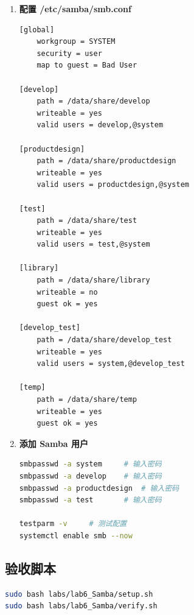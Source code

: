 \documentclass[12pt,a4paper]{ctexart}
\begin{document}
\begin{enumerate}[label=\arabic*.,leftmargin=*]
\begin{cmdbox}
\begin{lstlisting}[language=bash]
setfacl -m g:develop:rwx /data/share/develop_test
setfacl -m g:test:rwx    /data/share/develop_test
  \end{lstlisting}
  \end{cmdbox}

  \item \textbf{配置 /etc/samba/smb.conf}

  \begin{cmdbox}
  \small
  \begin{lstlisting}[language=bash]
[global]
    workgroup = SYSTEM
    security = user
    map to guest = Bad User

[develop]
    path = /data/share/develop
    writeable = yes
    valid users = develop,@system

[productdesign]
    path = /data/share/productdesign
    writeable = yes
    valid users = productdesign,@system

[test]
    path = /data/share/test
    writeable = yes
    valid users = test,@system

[library]
    path = /data/share/library
    writeable = no
    guest ok = yes

[develop_test]
    path = /data/share/develop_test
    writeable = yes
    valid users = system,@develop_test

[temp]
    path = /data/share/temp
    writeable = yes
    guest ok = yes
  \end{lstlisting}
  \end{cmdbox}

  \item \textbf{添加 Samba 用户}

  \begin{cmdbox}
  \begin{lstlisting}[language=bash]
smbpasswd -a system     # 输入密码
smbpasswd -a develop    # 输入密码
smbpasswd -a productdesign  # 输入密码
smbpasswd -a test       # 输入密码

testparm -v     # 测试配置
systemctl enable smb --now
  \end{lstlisting}
  \end{cmdbox}

\end{enumerate}

\subsection{验收脚本}

\begin{cmdbox}
\begin{lstlisting}[language=bash]
sudo bash labs/lab6_Samba/setup.sh
sudo bash labs/lab6_Samba/verify.sh
\end{lstlisting}
\end{cmdbox}
\end{document}
